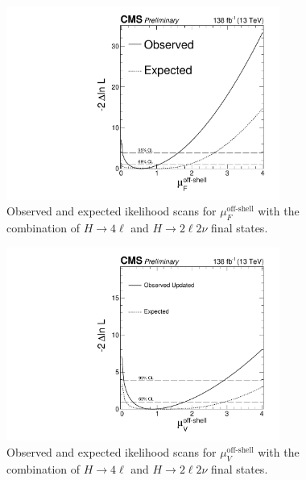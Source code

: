 \begin{figure}[!hbt]
\begin{center}
\includegraphics[width=0.8\textwidth]{figures/scan_muFoff_upd.pdf}
\caption
{
Observed and expected ikelihood scans for $\mu_F^{\text{off-shell}}$ with the combination of $H\to4\ell$ and $H\to2\ell2\nu$ final states.
\label{fig:1Dmus_F}
}
\end{center}
\end{figure}

\begin{figure}[!hbt]
\begin{center}
\includegraphics[width=0.8\textwidth]{figures/scan_muVoff_upd.pdf}
\caption
{
Observed and expected ikelihood scans for $\mu_V^{\text{off-shell}}$ with the combination of $H\to4\ell$ and $H\to2\ell2\nu$ final states.
\label{fig:1Dmus_V}
}
\end{center}
\end{figure}

